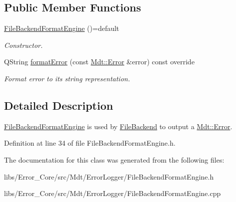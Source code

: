 \subsection*{Public Member Functions}
\begin{DoxyCompactItemize}
\item 
\hyperlink{class_mdt_1_1_error_logger_1_1_file_backend_format_engine_a27088cba340b0c8c626cf13ddbfa8270}{File\+Backend\+Format\+Engine} ()=default\hypertarget{class_mdt_1_1_error_logger_1_1_file_backend_format_engine_a27088cba340b0c8c626cf13ddbfa8270}{}\label{class_mdt_1_1_error_logger_1_1_file_backend_format_engine_a27088cba340b0c8c626cf13ddbfa8270}

\begin{DoxyCompactList}\small\item\em Constructor. \end{DoxyCompactList}\item 
Q\+String \hyperlink{class_mdt_1_1_error_logger_1_1_file_backend_format_engine_a08cb1b3eb6e1fe8d83f208ae04a7219d}{format\+Error} (const \hyperlink{class_mdt_1_1_error}{Mdt\+::\+Error} \&error) const override\hypertarget{class_mdt_1_1_error_logger_1_1_file_backend_format_engine_a08cb1b3eb6e1fe8d83f208ae04a7219d}{}\label{class_mdt_1_1_error_logger_1_1_file_backend_format_engine_a08cb1b3eb6e1fe8d83f208ae04a7219d}

\begin{DoxyCompactList}\small\item\em Format {\itshape error} to its string representation. \end{DoxyCompactList}\end{DoxyCompactItemize}


\subsection{Detailed Description}
\hyperlink{class_mdt_1_1_error_logger_1_1_file_backend_format_engine}{File\+Backend\+Format\+Engine} is used by \hyperlink{class_mdt_1_1_error_logger_1_1_file_backend}{File\+Backend} to output a \hyperlink{class_mdt_1_1_error}{Mdt\+::\+Error}. 

Definition at line 34 of file File\+Backend\+Format\+Engine.\+h.



The documentation for this class was generated from the following files\+:\begin{DoxyCompactItemize}
\item 
libs/\+Error\+\_\+\+Core/src/\+Mdt/\+Error\+Logger/File\+Backend\+Format\+Engine.\+h\item 
libs/\+Error\+\_\+\+Core/src/\+Mdt/\+Error\+Logger/File\+Backend\+Format\+Engine.\+cpp\end{DoxyCompactItemize}
